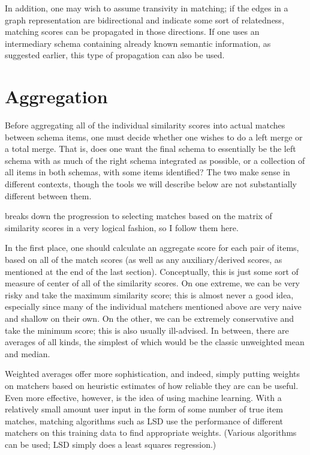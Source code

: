 \documentclass{datamade}
\theoremstyle{definition}
\theoremstyle{remark}
\begin{document}
In addition, one may wish to assume transivity in matching; if the edges in a graph representation are bidirectional and indicate some sort of relatedness, matching scores can be propagated in those directions. If one uses an intermediary schema containing already known semantic information, as suggested earlier, this type of propagation can also be used.

\section{Aggregation}

Before aggregating all of the individual similarity scores into actual matches between schema items, one must decide whether one wishes to do a left merge or a total merge. That is, does one want the final schema to essentially be the left schema with as much of the right schema integrated as possible, or a collection of all items in both schemas, with some items identified? The two make sense in different contexts, though the tools we will describe below are not substantially different between them.

\cite{coma} breaks down the progression to selecting matches based on the matrix of similarity scores in a very logical fashion, so I follow them here. 

In the first place, one should calculate an aggregate score for each pair of items, based on all of the match scores (as well as any auxiliary/derived scores, as mentioned at the end of the last section). Conceptually, this is just some sort of measure of center of all of the similarity scores. On one extreme, we can be very risky and take the maximum similarity score; this is almost never a good idea, especially since many of the individual matchers mentioned above are very naive and shallow on their own. On the other, we can be extremely conservative and take the minimum score; this is also usually ill-advised. In between, there are averages of all kinds, the simplest of which would be the classic unweighted mean and median. 

Weighted averages offer more sophistication, and indeed, simply putting weights on matchers based on heuristic estimates of how reliable they are can be useful. Even more effective, however, is the idea of using machine learning. With a relatively small amount user input in the form of some number of true item matches, matching algorithms such as LSD \cite{machine} use the performance of different matchers on this training data to find appropriate weights. (Various algorithms can be used; LSD simply does a least squares regression.) 
\end{document}
